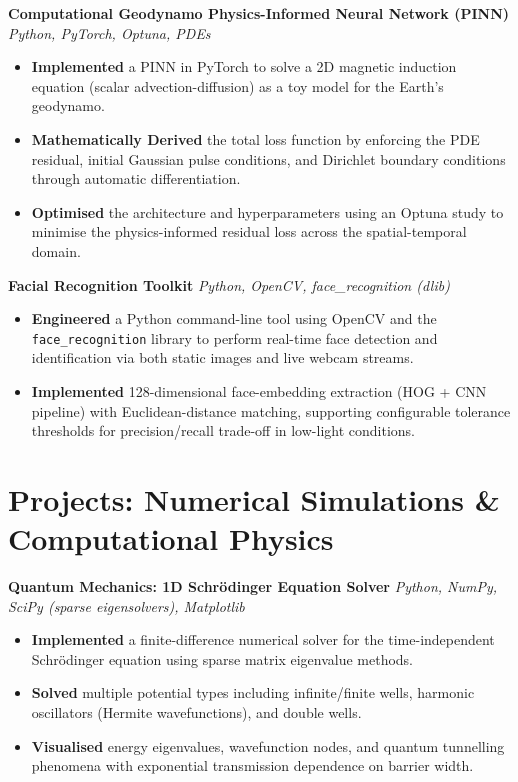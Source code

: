 \documentclass[10pt, a4paper]{article}
\newenvironment{project}[2]{%
  \textbf{\color{accent}#1} \hfill
  \small\textit{\color{light}#2}%
  \begin{itemize}%
}{%
  \end{itemize}%
  \vspace{2pt}%
}
\begin{document}
\begin{project}{Computational Geodynamo Physics-Informed Neural Network (PINN)}{Python, PyTorch, Optuna, PDEs}
  \item \textbf{Implemented} a PINN in PyTorch to solve a 2D magnetic induction equation (scalar advection-diffusion) as a toy model for the Earth's geodynamo.
  \item \textbf{Mathematically Derived} the total loss function by enforcing the PDE residual, initial Gaussian pulse conditions, and Dirichlet boundary conditions through automatic differentiation.
  \item \textbf{Optimised} the architecture and hyperparameters using an Optuna study to minimise the physics-informed residual loss across the spatial-temporal domain.
\end{project}

\begin{project}{Facial Recognition Toolkit}{Python, OpenCV, face\_recognition (dlib)}
  \item \textbf{Engineered} a Python command-line tool using OpenCV and the \texttt{face\_recognition}
        library to perform real-time face detection and identification via both static images and
        live webcam streams.
  \item \textbf{Implemented} 128-dimensional face-embedding extraction (HOG + CNN pipeline)
        with Euclidean-distance matching, supporting configurable tolerance thresholds for
        precision/recall trade-off in low-light conditions.
\end{project}

\section{Projects: Numerical Simulations \& Computational Physics}

\begin{project}{Quantum Mechanics: 1D Schrödinger Equation Solver}{Python, NumPy, SciPy (sparse eigensolvers), Matplotlib}
  \item \textbf{Implemented} a finite-difference numerical solver for the time-independent Schrödinger equation using sparse matrix eigenvalue methods.
  \item \textbf{Solved} multiple potential types including infinite/finite wells, harmonic oscillators (Hermite wavefunctions), and double wells.
  \item \textbf{Visualised} energy eigenvalues, wavefunction nodes, and quantum tunnelling phenomena with exponential transmission dependence on barrier width.
\end{project}
\end{document}
